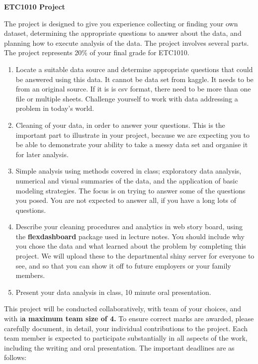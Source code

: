 \documentclass{article}
\begin{document}
\centerline{\Large\bf ETC1010 Project}
\bigskip

The project is designed to give you experience collecting or finding your own dataset, determining the
appropriate questions to answer about the data, and planning how to execute analysis of the data.  The project involves several parts. The project represents 20\% of your final grade for ETC1010.

\begin{enumerate} \itemsep 0in
\item Locate a suitable data source and determine appropriate questions that could be answered using this data. It cannot be data set from kaggle. It needs to be from an original source. If it is is csv format, there need to be more than one file or multiple sheets. Challenge yourself to work with data addressing a problem in today's world.
\item Cleaning of your data, in order to answer your questions. This is the important part to illustrate in your project, because we are expecting you to be able to demonstrate your ability to take a messy data set and organise it for later analysis.
\item Simple analysis using methods covered in class; exploratory data analysis, numerical and visual summaries of the data, and the application of basic modeling strategies. The focus is on trying to answer some of the questions you posed. You are not expected to answer all, if you have a long lots of questions. 
\item Describe your cleaning procedures and analytics in web story board, using the {\bf flexdashboard} package used in lecture notes. You  should include why you chose the data and what learned about the problem by completing this project. We will upload these to the departmental shiny server for everyone to see, and so that you can show it off to future employers or your family members.
\item Present your data analysis in class,  10 minute oral presentation.
\end{enumerate}

This project will be conducted collaboratively, with team of your choices, and with  i\textbf{a maximum team size of 4.} To ensure correct marks are awarded, please carefully document, in detail, your individual contributions to the project. Each team member is expected to participate substantially in all aspects of the work, including the writing and oral presentation. The important deadlines are as follows: 
\end{document}

